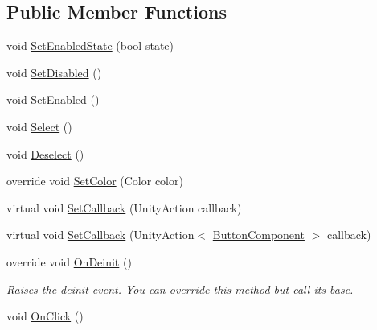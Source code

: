\subsection*{Public Member Functions}
\begin{DoxyCompactItemize}
\item 
void \hyperlink{class_unity_engine_1_1_u_i_1_1_windows_1_1_components_1_1_button_component_a802ba86dab2b6adb949fdc6da9d2a2f7}{Set\+Enabled\+State} (bool state)
\item 
void \hyperlink{class_unity_engine_1_1_u_i_1_1_windows_1_1_components_1_1_button_component_a56d037b6805ba7906529e14931f1d0cb}{Set\+Disabled} ()
\item 
void \hyperlink{class_unity_engine_1_1_u_i_1_1_windows_1_1_components_1_1_button_component_a2628a47470ff922c0beef612e9a85cab}{Set\+Enabled} ()
\item 
void \hyperlink{class_unity_engine_1_1_u_i_1_1_windows_1_1_components_1_1_button_component_a9582d4e24b6bddee1697603ececd5d89}{Select} ()
\item 
void \hyperlink{class_unity_engine_1_1_u_i_1_1_windows_1_1_components_1_1_button_component_a5b531850ae43324d3c0e08d4339a66dc}{Deselect} ()
\item 
override void \hyperlink{class_unity_engine_1_1_u_i_1_1_windows_1_1_components_1_1_button_component_a314a01ca0eca508c95c4e69a729a51ff}{Set\+Color} (Color color)
\item 
virtual void \hyperlink{class_unity_engine_1_1_u_i_1_1_windows_1_1_components_1_1_button_component_a7bd30395387d98ac0530dba525f2f43d}{Set\+Callback} (Unity\+Action callback)
\item 
virtual void \hyperlink{class_unity_engine_1_1_u_i_1_1_windows_1_1_components_1_1_button_component_a9397f9d5f648c37de347d1f71e8921ab}{Set\+Callback} (Unity\+Action$<$ \hyperlink{class_unity_engine_1_1_u_i_1_1_windows_1_1_components_1_1_button_component}{Button\+Component} $>$ callback)
\item 
override void \hyperlink{class_unity_engine_1_1_u_i_1_1_windows_1_1_components_1_1_button_component_a375e393586ef3f2475e44e64ed395dd3}{On\+Deinit} ()
\begin{DoxyCompactList}\small\item\em Raises the deinit event. You can override this method but call it\textquotesingle{}s base. \end{DoxyCompactList}\item 
void \hyperlink{class_unity_engine_1_1_u_i_1_1_windows_1_1_components_1_1_button_component_a9c6eca628b6dd7469b91b25a1700776a}{On\+Click} ()
\end{DoxyCompactItemize}
